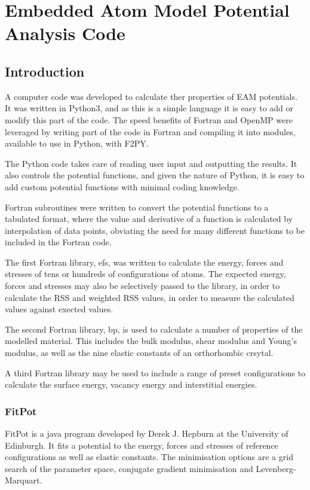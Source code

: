 \section{Embedded Atom Model Potential Analysis Code}

\subsection{Introduction}

A computer code was developed to calculate ther properties of EAM potentials.  It was written in Python3, and as this is a simple language it is easy to add or modify this part of the code.  The speed benefits of Fortran and OpenMP were leveraged by writing part of the code in Fortran and compiling it into modules, available to use in Python, with F2PY.

The Python code takes care of reading user input and outputting the results.  It also controls the potential functions, and given the nature of Python, it is easy to add custom potential functions with minimal coding knowledge.  

Fortran subroutines were written to convert the potential functions to a tabulated format, where the value and derivative of a function is calculated by interpolation of data points, obviating the need for many different functions to be included in the Fortran code.  

The first Fortran library, efs, was written to calculate the energy, forces and stresses of tens or hundreds of configurations of atoms.  The expected energy, forces and stresses may also be selectively passed to the library, in order to calculate the RSS and weighted RSS values, in order to measure the calculated values against exected values.

The second Fortran library, bp, is used to calculate a number of properties of the modelled material.  This includes the bulk modulus, shear modulus and Young's modulus, as well as the nine elastic constants of an orthorhombic crsytal.

A third Fortran library may be used to include a range of preset configurations to calculate the surface energy, vacancy energy and interstitial energies.  



\subsubsection{FitPot}

FitPot is a java program developed by Derek J. Hepburn at the University of Edinburgh.  It fits a potential to the energy, forces and stresses of reference configurations as well as elastic constants.  The minimisation options are a grid search of the parameter space, conjugate gradient minimisation and Levenberg-Marquart.  

